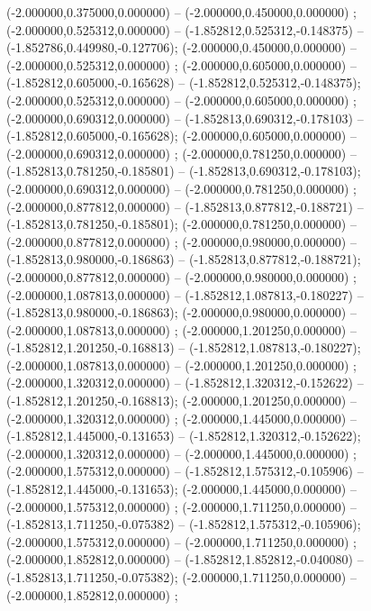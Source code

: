  (-2.000000,0.375000,0.000000) -- (-2.000000,0.450000,0.000000) ;
 (-2.000000,0.525312,0.000000) -- (-1.852812,0.525312,-0.148375) -- (-1.852786,0.449980,-0.127706);
 (-2.000000,0.450000,0.000000) -- (-2.000000,0.525312,0.000000) ;
 (-2.000000,0.605000,0.000000) -- (-1.852812,0.605000,-0.165628) -- (-1.852812,0.525312,-0.148375);
 (-2.000000,0.525312,0.000000) -- (-2.000000,0.605000,0.000000) ;
 (-2.000000,0.690312,0.000000) -- (-1.852813,0.690312,-0.178103) -- (-1.852812,0.605000,-0.165628);
 (-2.000000,0.605000,0.000000) -- (-2.000000,0.690312,0.000000) ;
 (-2.000000,0.781250,0.000000) -- (-1.852813,0.781250,-0.185801) -- (-1.852813,0.690312,-0.178103);
 (-2.000000,0.690312,0.000000) -- (-2.000000,0.781250,0.000000) ;
 (-2.000000,0.877812,0.000000) -- (-1.852813,0.877812,-0.188721) -- (-1.852813,0.781250,-0.185801);
 (-2.000000,0.781250,0.000000) -- (-2.000000,0.877812,0.000000) ;
 (-2.000000,0.980000,0.000000) -- (-1.852813,0.980000,-0.186863) -- (-1.852813,0.877812,-0.188721);
 (-2.000000,0.877812,0.000000) -- (-2.000000,0.980000,0.000000) ;
 (-2.000000,1.087813,0.000000) -- (-1.852812,1.087813,-0.180227) -- (-1.852813,0.980000,-0.186863);
 (-2.000000,0.980000,0.000000) -- (-2.000000,1.087813,0.000000) ;
 (-2.000000,1.201250,0.000000) -- (-1.852812,1.201250,-0.168813) -- (-1.852812,1.087813,-0.180227);
 (-2.000000,1.087813,0.000000) -- (-2.000000,1.201250,0.000000) ;
 (-2.000000,1.320312,0.000000) -- (-1.852812,1.320312,-0.152622) -- (-1.852812,1.201250,-0.168813);
 (-2.000000,1.201250,0.000000) -- (-2.000000,1.320312,0.000000) ;
 (-2.000000,1.445000,0.000000) -- (-1.852812,1.445000,-0.131653) -- (-1.852812,1.320312,-0.152622);
 (-2.000000,1.320312,0.000000) -- (-2.000000,1.445000,0.000000) ;
 (-2.000000,1.575312,0.000000) -- (-1.852812,1.575312,-0.105906) -- (-1.852812,1.445000,-0.131653);
 (-2.000000,1.445000,0.000000) -- (-2.000000,1.575312,0.000000) ;
 (-2.000000,1.711250,0.000000) -- (-1.852813,1.711250,-0.075382) -- (-1.852812,1.575312,-0.105906);
 (-2.000000,1.575312,0.000000) -- (-2.000000,1.711250,0.000000) ;
 (-2.000000,1.852812,0.000000) -- (-1.852812,1.852812,-0.040080) -- (-1.852813,1.711250,-0.075382);
 (-2.000000,1.711250,0.000000) -- (-2.000000,1.852812,0.000000) ;
